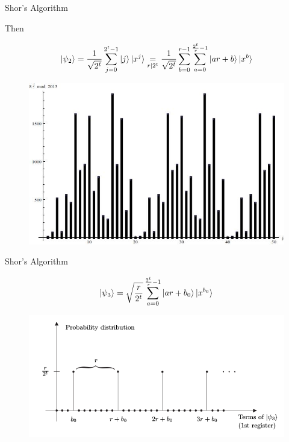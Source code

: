 \documentclass{beamer}
\begin{document}
\begin{frame}{Shor's Algorithm}

Then
{\small

\[
\ket{\psi_2}=\frac{1}{\sqrt{2^t}}\sum_{j=0}^{2^t-1}\ket{j}\ket{x^j} \underset{r|2^t}{=} \frac{1}{\sqrt{2^t}}\sum_{b=0}^{r-1}\sum_{a=0}^{\frac{2^t}{r}-1}\ket{ar+b}\ket{x^b}
\]
}
\begin{figure}[ht]
  \includegraphics[scale=.3]{pasted9}
\end{figure}
\end{frame}
\begin{frame}{Shor's Algorithm}

\[
\ket{\psi_3}=\sqrt{\frac{r}{2^t}}\sum_{a=0}^{\frac{2^t}{r}-1}\ket{ar+b_0}\ket{x^{b_0}}
\]

\begin{figure}[ht]
  \includegraphics[scale=.5]{pasted7}
\end{figure}

\end{frame}
\end{document}
